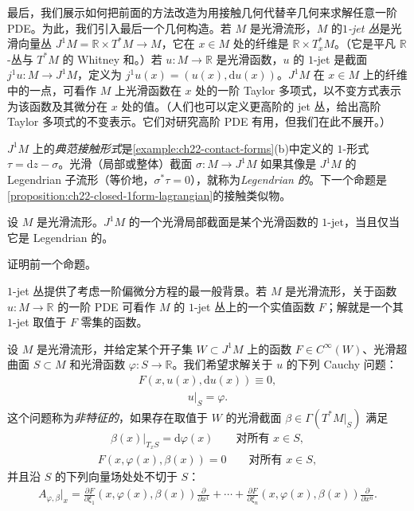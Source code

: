 \documentclass[../../main.tex]{subfiles}
\begin{document}
最后，我们展示如何把前面的方法改造为用接触几何代替辛几何来求解任意一阶 PDE。为此，我们引入最后一个几何构造。若 $M$ 是光滑流形，$M$ 的\emph{$1$-jet 丛}是光滑向量丛 $J^1M=\mathbb R\times T^*M\to M$，它在 $x\in M$ 处的纤维是 $\mathbb R\times T^*_xM$。（它是平凡 $\mathbb R$-丛与 $T^*M$ 的 Whitney 和。）若 $u:M\to\mathbb R$ 是光滑函数，$u$ 的 $1$-jet 是截面 $j^1u:M\to J^1M$，定义为 $j^1u(x)=(u(x),\mathrm{d}u(x))$。$J^1M$ 在 $x\in M$ 上的纤维中的一点，可看作 $M$ 上光滑函数在 $x$ 处的一阶 Taylor 多项式，以不变方式表示为该函数及其微分在 $x$ 处的值。（人们也可以定义更高阶的 jet 丛，给出高阶 Taylor 多项式的不变表示。它们对研究高阶 PDE 有用，但我们在此不展开。）

$J^1M$ 上的\emph{典范接触形式}是\cref{example:ch22-contact-forms}(b)中定义的 $1$-形式 $\tau=\mathrm{d}z-\sigma$。光滑（局部或整体）截面 $\sigma:M\to J^1M$ 如果其像是 $J^1M$ 的 Legendrian 子流形（等价地，$\sigma^*\tau=0$），就称为\emph{Legendrian 的}。下一个命题是\cref{proposition:ch22-closed-1form-lagrangian}的接触类似物。

\begin{proposition}\label{proposition:ch22-legendrian-jet}
设 $M$ 是光滑流形。$J^1M$ 的一个光滑局部截面是某个光滑函数的 $1$-jet，当且仅当它是 Legendrian 的。
\end{proposition}

\begin{exercise}\label{exercise:ch22-38}
证明前一个命题。
\end{exercise}

$1$-jet 丛提供了考虑一阶偏微分方程的最一般背景。若 $M$ 是光滑流形，关于函数 $u:M\to\mathbb R$ 的一阶 PDE 可看作 $M$ 的 $1$-jet 丛上的一个实值函数 $F$；解就是一个其 $1$-jet 取值于 $F$ 零集的函数。

设 $M$ 是光滑流形，并给定某个开子集 $W\subset J^1M$ 上的函数 $F\in C^\infty(W)$、光滑超曲面 $S\subset M$ 和光滑函数 $\varphi:S\to\mathbb R$。我们希望求解关于 $u$ 的下列 Cauchy 问题：
\begin{align}
F(x,u(x),\mathrm{d}u(x))\equiv0,
\end{align}
\begin{align}
u|_S=\varphi.
\end{align}
这个问题称为\emph{非特征的}，如果存在取值于 $W$ 的光滑截面 $\beta\in\Gamma(T^*M|_S)$ 满足
\begin{align}
\beta(x)|_{T_xS}=\mathrm{d}\varphi(x)\qquad\text{对所有 }x\in S,
\end{align}
\begin{align}
F(x,\varphi(x),\beta(x))=0\qquad\text{对所有 }x\in S,
\end{align}
并且沿 $S$ 的下列向量场处处不切于 $S$：
\begin{align}
A_{\varphi,\beta}|_x=\frac{\partial F}{\partial\xi_1}(x,\varphi(x),\beta(x))\frac{\partial}{\partial x^1}+\cdots+\frac{\partial F}{\partial\xi_n}(x,\varphi(x),\beta(x))\frac{\partial}{\partial x^n}.
\end{align}
\end{document}
